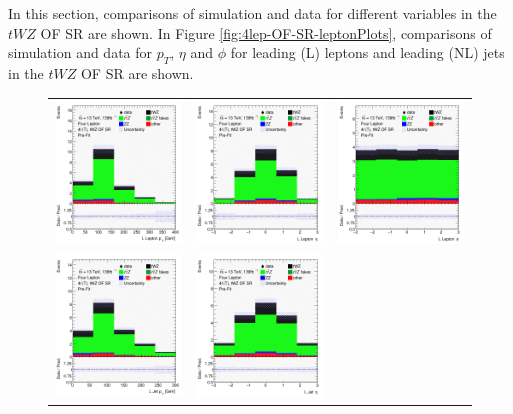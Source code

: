 In this section, comparisons of simulation and data for different variables in the $tWZ$ OF SR are shown. In Figure \ref{fig:4lep-OF-SR-leptonPlots}, comparisons of simulation and data for $p_{T}$, $\eta$ and $\phi$ for leading (L) leptons and leading (NL) jets in the $tWZ$ OF SR are shown.
\begin{figure}[htbp]
\centering
  \begin{tabular}{ccc}


    \includegraphics[width=.25\textwidth]{figures/PreFitPlots/lep4_tWZ_4T_OF_L_lepton_pt.png} &
    \includegraphics[width=.25\textwidth]{figures/PreFitPlots/lep4_tWZ_4T_OF_L_lepton_eta.png} &
    \includegraphics[width=.25\textwidth]{figures/PreFitPlots/lep4_tWZ_4T_OF_L_lepton_phi.png} \\
    \includegraphics[width=.25\textwidth]{figures/PreFitPlots/lep4_tWZ_4T_OF_LJet_pt.png} &
    \includegraphics[width=.25\textwidth]{figures/PreFitPlots/lep4_tWZ_4T_OF_LJet_eta.png} &

\end{tabular}
\end{figure}
